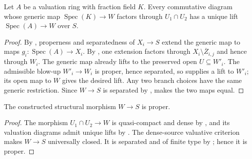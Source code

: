 \begin{lemma}
  \label{lemma:nagata-two-open-valuative-lifting}

  Let $A$ be a valuation ring with fraction field $K$.  Every commutative
  diagram whose generic map
  $\operatorname{Spec}(K)\to W$ factors through $U_1\cap U_2$ has a unique
  lift $\operatorname{Spec}(A)\to W$ over $S$.
\end{lemma}

\begin{proof}
  By
  , properness and
  separatedness of $X_i\to S$ extend the generic map to maps
  $g_i\colon\operatorname{Spec}(A)\to X_i$.  By
  , one extension factors
  through $X_i\setminus\overline Z_{i,j}$ and hence through $W_i$.  The
  generic map already lifts to the preserved open $U\subseteq W'_i$.
  The admissible blow-up $W'_i\to W_i$ is proper, hence separated, so
   supplies a lift
  to $W'_i$; its open map to $W$ gives the desired lift.  Any two branch
  choices have the same generic restriction.  Since $W\to S$ is separated by
  ,
   makes the two maps
  equal.
\end{proof}

\begin{lemma}
  \label{lemma:nagata-two-open-candidate-proper}

  The constructed structural morphism $W\to S$ is proper.
\end{lemma}

\begin{proof}
  The morphism $U_1\cap U_2\to W$ is quasi-compact and dense by
  , and its valuation diagrams admit unique
  lifts by .  The dense-source
  valuative criterion makes $W\to S$ universally closed.  It is separated
  and of finite type by
  ; hence it is proper.
\end{proof}

